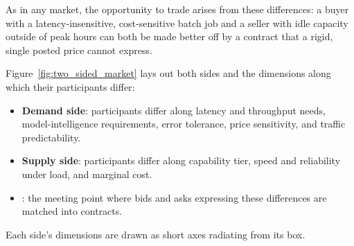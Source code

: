 As in any market, the opportunity to trade arises from these differences:
a buyer with a latency-insensitive, cost-sensitive batch job and a seller
with idle capacity outside of peak hours can both be made better off by a
contract that a rigid, single posted price cannot express.

Figure~\ref{fig:two_sided_market} lays out both sides and the dimensions
along which their participants differ:

\begin{itemize}
  \item \textbf{Demand side}: participants differ along latency and
    throughput needs, model-intelligence requirements, error tolerance, price
    sensitivity, and traffic predictability.
  \item \textbf{Supply side}: participants differ along capability tier, speed
    and reliability under load, and marginal cost.
  \item \textbf{\NoesisMarket}: the meeting point where bids and asks
    expressing these differences are matched into contracts.
\end{itemize}

Each side's dimensions are drawn as short axes radiating from its box.

